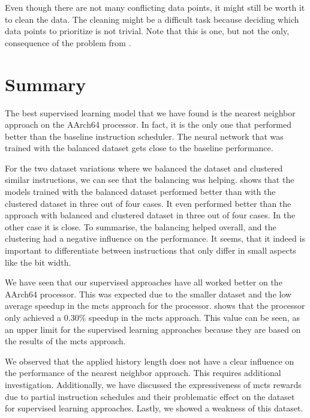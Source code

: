 Even though there are not many conflicting data points, it might still be worth it to clean the data.
The cleaning might be a difficult task because deciding which data points to prioritize is not trivial.
Note that this is one, but not the only, consequence of the problem from .


\section{Summary}
The best supervised learning model that we have found is the nearest neighbor approach on the AArch64 processor.
In fact, it is the only one that performed better than the baseline instruction scheduler.
The neural network that was trained with the balanced dataset gets close to the baseline performance.

For the two dataset variations where we balanced the dataset and clustered similar instructions, we can see that the balancing was helping.
 shows that the models trained with the balanced dataset performed better than with the clustered dataset in three out of four cases.
It even performed better than the approach with balanced and clustered dataset in three out of four cases.
In the other case it is close.
To summarise, the balancing helped overall, and the clustering had a negative influence on the performance.
It seems, that it indeed is important to differentiate between instructions that only differ in small aspects like the bit width. 

We have seen that our supervised approaches have all worked better on the AArch64 processor.
This was expected due to the smaller dataset and the low average speedup in the \ac{mcts} approach for the \aurora processor.
 shows that the \aurora processor only achieved a 0.30\% speedup in the \ac{mcts} approach.
This value can be seen, as an upper limit for the supervised learning approaches because they are based on the results of the \ac{mcts} approach.

We observed that the applied history length does not have a clear influence on the performance of the nearest neighbor approach.
This requires additional investigation.
Additionally, we have discussed the expressiveness of \ac{mcts} rewards due to partial instruction schedules and their problematic effect on the dataset for supervised learning approaches.
Lastly, we showed a weakness of this dataset.
